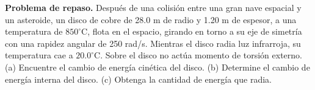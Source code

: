 \item \textbf{Problema de repaso.} Después de una colisión entre una gran nave espacial y un asteroide, un disco de cobre de 28.0 m de radio y 1.20 m de espesor, a una temperatura de $850^\circ\text{C}$, flota en el espacio, girando en torno a su eje de simetría con una rapidez angular de 250 rad/s. Mientras el disco radia luz infrarroja, su temperatura cae a $20.0^\circ\text{C}$. Sobre el disco no actúa momento de torsión externo. (a) Encuentre el cambio de energía cinética del disco. (b) Determine el cambio de energía interna del disco. (c) Obtenga la cantidad de energía que radia.
